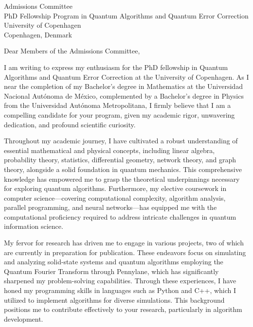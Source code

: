 \documentclass[a4paper,10pt]{letter}
\begin{document}
\begin{letter}{Admissions Committee\\
PhD Fellowship Program in Quantum Algorithms and Quantum Error Correction\\
University of Copenhagen\\
Copenhagen, Denmark}

\address{
Erick Jesús Ríos González\\
Toltecas 480, Ajusco, Coyoacán\\
Mexico City, 04300\\
\href{mailto:erickjesusriosgonzalez@gmail.com}{erickjesusriosgonzalez@gmail.com}\\
(+52) 951 587 1972\\
}

\opening{Dear Members of the Admissions Committee,}

I am writing to express my enthusiasm for the PhD fellowship in Quantum Algorithms and Quantum Error Correction at the University of Copenhagen. As I near the completion of my Bachelor’s degree in Mathematics at the Universidad Nacional Autónoma de México, complemented by a Bachelor’s degree in Physics from the Universidad Autónoma Metropolitana, I firmly believe that I am a compelling candidate for your program, given my academic rigor, unwavering dedication, and profound scientific curiosity.

Throughout my academic journey, I have cultivated a robust understanding of essential mathematical and physical concepts, including linear algebra, probability theory, statistics, differential geometry, network theory, and graph theory, alongside a solid foundation in quantum mechanics. This comprehensive knowledge has empowered me to grasp the theoretical underpinnings necessary for exploring quantum algorithms. Furthermore, my elective coursework in computer science—covering computational complexity, algorithm analysis, parallel programming, and neural networks—has equipped me with the computational proficiency required to address intricate challenges in quantum information science.

My fervor for research has driven me to engage in various projects, two of which are currently in preparation for publication. These endeavors focus on simulating and analyzing solid-state systems and quantum algorithms employing the Quantum Fourier Transform through Pennylane, which has significantly sharpened my problem-solving capabilities. Through these experiences, I have honed my programming skills in languages such as Python and C++, which I utilized to implement algorithms for diverse simulations. This background positions me to contribute effectively to your research, particularly in algorithm development.


\end{letter}
\end{document}
